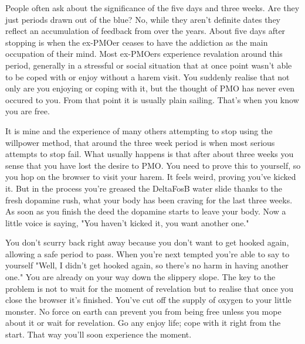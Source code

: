 People often ask about the significance of the five days and three weeks. Are they just periods drawn out of the blue? No, while they aren't definite dates they reflect an accumulation of feedback from over the years. About five days after stopping is when the ex-PMOer ceases to have the addiction as the main occupation of their mind. Most ex-PMOers experience revalation around this period, generally in a stressful or social situation that at once point wasn't able to be coped with or enjoy without a harem visit. You suddenly realise that not only are you enjoying or coping with it, but the thought of PMO has never even occured to you. From that point it is usually plain sailing. That's when you know you are free.

It is mine and the experience of many others attempting to stop using the willpower method, that around the three week period is when most serious attempts to stop fail. What usually happens is that after about three weeks you sense that you have lost the desire to PMO. You need to prove this to yourself, so you hop on the browser to visit your harem. It feels weird, proving you've kicked it. But in the process you're greased the DeltaFosB water slide thanks to the fresh dopamine rush, what your body has been craving for the last three weeks. As soon as you finish the deed the dopamine starts to leave your body. Now a little voice is saying, "You haven't kicked it, you want another one."

You don't scurry back right away because you don't want to get hooked again, allowing a safe period to pass. When you're next tempted you're able to say to yourself "Well, I didn't get hooked again, so there's no harm in having another one." You are already on your way down the slippery slope. The key to the problem is not to wait for the moment of revelation but to realise that once you close the browser it's finished. You've cut off the supply of oxygen to your little monster. No force on earth can prevent you from being free unless you mope about it or wait for revelation. Go any enjoy life; cope with it right from the start. That way you'll soon experience the moment.
